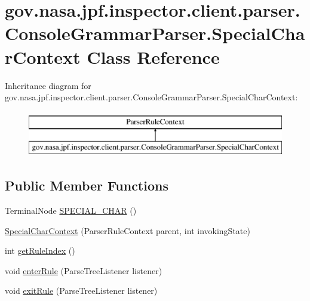 \hypertarget{classgov_1_1nasa_1_1jpf_1_1inspector_1_1client_1_1parser_1_1_console_grammar_parser_1_1_special_char_context}{}\section{gov.\+nasa.\+jpf.\+inspector.\+client.\+parser.\+Console\+Grammar\+Parser.\+Special\+Char\+Context Class Reference}
\label{classgov_1_1nasa_1_1jpf_1_1inspector_1_1client_1_1parser_1_1_console_grammar_parser_1_1_special_char_context}
Inheritance diagram for gov.\+nasa.\+jpf.\+inspector.\+client.\+parser.\+Console\+Grammar\+Parser.\+Special\+Char\+Context\+:\begin{figure}[H]
\begin{center}
\leavevmode
\includegraphics[height=2.000000cm]{classgov_1_1nasa_1_1jpf_1_1inspector_1_1client_1_1parser_1_1_console_grammar_parser_1_1_special_char_context}
\end{center}
\end{figure}
\subsection*{Public Member Functions}
\begin{DoxyCompactItemize}
\item 
Terminal\+Node \hyperlink{classgov_1_1nasa_1_1jpf_1_1inspector_1_1client_1_1parser_1_1_console_grammar_parser_1_1_special_char_context_a95c8525bb462d150443e3acf3a19502e}{S\+P\+E\+C\+I\+A\+L\+\_\+\+C\+H\+AR} ()
\item 
\hyperlink{classgov_1_1nasa_1_1jpf_1_1inspector_1_1client_1_1parser_1_1_console_grammar_parser_1_1_special_char_context_aa7ee98e8be478719a58312da44fa78c8}{Special\+Char\+Context} (Parser\+Rule\+Context parent, int invoking\+State)
\item 
int \hyperlink{classgov_1_1nasa_1_1jpf_1_1inspector_1_1client_1_1parser_1_1_console_grammar_parser_1_1_special_char_context_adf5ea815beb1c0ed3d8f7cf45b38e730}{get\+Rule\+Index} ()
\item 
void \hyperlink{classgov_1_1nasa_1_1jpf_1_1inspector_1_1client_1_1parser_1_1_console_grammar_parser_1_1_special_char_context_a71e92564f1e69e28a4f526e69cda6754}{enter\+Rule} (Parse\+Tree\+Listener listener)
\item 
void \hyperlink{classgov_1_1nasa_1_1jpf_1_1inspector_1_1client_1_1parser_1_1_console_grammar_parser_1_1_special_char_context_ad167803fc0efc3db44385921c08322f8}{exit\+Rule} (Parse\+Tree\+Listener listener)
\end{DoxyCompactItemize}


